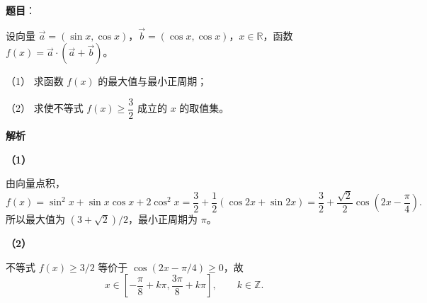 \begin{answer}

\textbf{题目}：

设向量 $\vec a=(\sin x,\cos x)$，$\vec b=(\cos x,\cos x)$，$x\in\mathbb R$，函数 $f(x)=\vec a\cdot(\vec a+\vec b)$。

（1） 求函数 $f(x)$ 的最大值与最小正周期；

（2） 求使不等式 $f(x)\geqslant\dfrac32$ 成立的 $x$ 的取值集。

\textbf{解析}

\textbf{（1）}

由向量点积，
\nopagebreak[4]
\[
f(x)=\sin^2x+\sin x\cos x+2\cos^2x
=\frac32+\frac12(\cos2x+\sin2x)
=\frac32+\frac{\sqrt2}{2}\cos\left(2x-\frac\pi4\right).
\]
所以最大值为 $(3+\sqrt2)/2$，最小正周期为 $\pi$。

\textbf{（2）}

不等式 $f(x)\geqslant3/2$ 等价于 $\cos(2x-\pi/4)\geqslant0$，故
\nopagebreak[4]
\[
x\in\left[-\frac\pi8+k\pi,\frac{3\pi}8+k\pi\right],\qquad k\in\mathbb Z.
\]



\end{answer}
